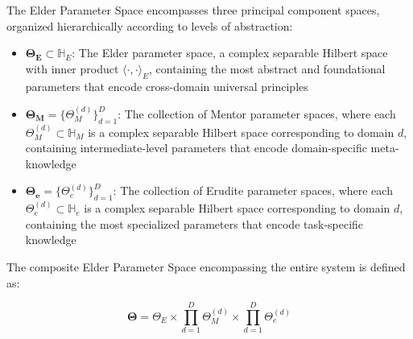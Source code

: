\begin{definition}
\label{def:elder_parameter_space}
The Elder Parameter Space encompasses three principal component spaces, organized hierarchically according to levels of abstraction:

\begin{itemize}
    \item $\boldsymbol{\Theta_E} \subset \mathbb{H}_E$: The Elder parameter space, a complex separable Hilbert space with inner product $\langle \cdot, \cdot \rangle_E$, containing the most abstract and foundational parameters that encode cross-domain universal principles
    
    \item $\boldsymbol{\Theta_M} = \{\Theta_M^{(d)}\}_{d=1}^D$: The collection of Mentor parameter spaces, where each $\Theta_M^{(d)} \subset \mathbb{H}_M$ is a complex separable Hilbert space corresponding to domain $d$, containing intermediate-level parameters that encode domain-specific meta-knowledge
    
    \item $\boldsymbol{\Theta_e} = \{\Theta_e^{(d)}\}_{d=1}^D$: The collection of Erudite parameter spaces, where each $\Theta_e^{(d)} \subset \mathbb{H}_e$ is a complex separable Hilbert space corresponding to domain $d$, containing the most specialized parameters that encode task-specific knowledge
\end{itemize}

The composite Elder Parameter Space encompassing the entire system is defined as:

\begin{equation}
\boldsymbol{\Theta} = \Theta_E \times \prod_{d=1}^D \Theta_M^{(d)} \times \prod_{d=1}^D \Theta_e^{(d)}
\end{equation}
\end{definition}



